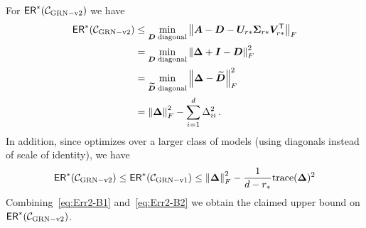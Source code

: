 For ${\sf ER}^*(\mathcal{C}_{\rm GRN-v2{}})$ we have
\begin{align}
   {\sf ER}^*(\mathcal{C}_{\rm GRN-v2{}})&\le
   \min_{{\bm{D}}\; {\rm diagonal}} \left\|{\bm{A}}-{\bm{D}} - {\bm{U}}_{r*}\boldsymbol{\Sigma}_{r*} {\bm{V}}_{r*}^{\sf T}\right\|_{F}\nonumber\\
   &= \min_{{\bm{D}}\; {\rm diagonal}} \left\|\bm{\Delta}+\bm{I}-{\bm{D}}\right\|_{F}^2\nonumber\\
   &= \min_{\widetilde{{\bm{D}}}\; {\rm diagonal}} \left\|\bm{\Delta}-\widetilde{{\bm{D}}}\right\|_{F}^2 \nonumber\\
   &= \left\|\bm{\Delta}\right\|_{F}^2 - \sum_{i=1}^d \Delta_{ii}^2\,.\label{eq:Err2-B1}
\end{align}
In addition, since \GenB{} optimizes over a larger class of models (using diagonals instead of scale of identity), we have
\begin{align}\label{eq:Err2-B2}
{\sf ER}^*(\mathcal{C}_{\rm GRN-v2{}}) \le {\sf ER}^*(\mathcal{C}_{\rm GRN-v1{}}) \le \left\|\bm{\Delta}\right\|_{F}^2 - \frac{1}{d-r_*}{{\operatorname{trace}}}(\bm{\Delta})^2
\end{align}
Combining~\eqref{eq:Err2-B1} and~\eqref{eq:Err2-B2} we obtain the claimed upper bound on ${\sf ER}^*(\mathcal{C}_{\rm GRN-v2{}})$.

